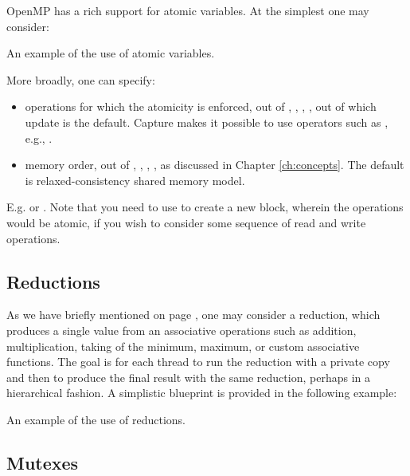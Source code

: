 OpenMP has a rich support for atomic variables. 
At the simplest one may consider:

\raggedbottom
\begin{codebox}[]{\href{https://godbolt.org/z/baqqEMKEe}{\ExternalLink}}
\footnotesize An example of the use of atomic variables.
\tcblower
{}
\end{codebox}

More broadly, one can specify:
\begin{itemize}
\item operations for which the atomicity is enforced, out of ,  , , , out of which update is the default. Capture makes it possible to use operators such as \cpp{+=}, e.g., .
\item memory order, out of , , ,  ,   as discussed in Chapter \ref{ch:concepts}. The default is relaxed-consistency shared memory model.
\end{itemize}

E.g.  or .
Note that you need to use \cpp{{}} to create a new block, wherein the operations would be atomic, if you wish to consider some sequence of read and write operations. 

\subsection{Reductions}

As we have briefly mentioned on page \pageref{sec:reduction1}, one may consider a reduction, which produces a single value from an associative operations such as addition, multiplication, taking of the minimum, maximum, or custom associative functions. The goal is for each thread to run the reduction with a private copy and then to produce the final result with the same reduction, perhaps in a hierarchical fashion. A simplistic blueprint is provided in the following example:

\raggedbottom
\begin{codebox}[]{\href{https://godbolt.org/z/orfM3x13M}{\ExternalLink}}
\footnotesize An example of the use of reductions.
\tcblower
{}
\end{codebox}

\subsection{Mutexes}

